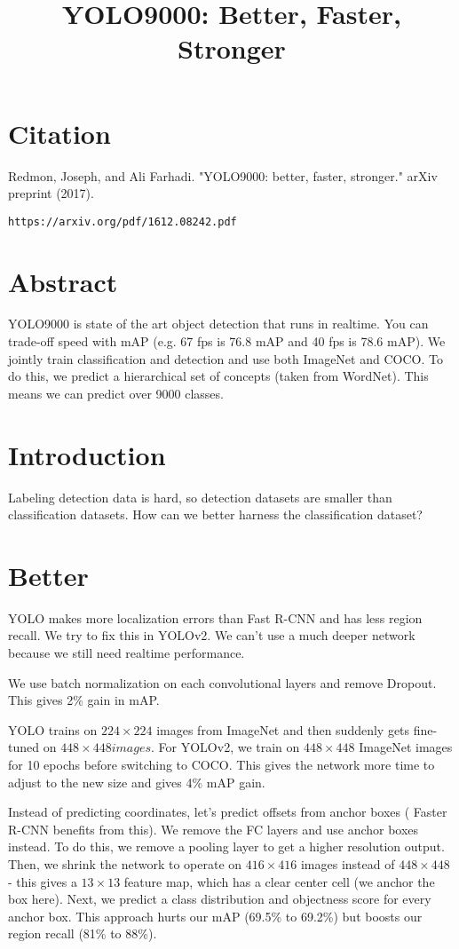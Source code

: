 \documentclass[a4paper]{article}
\title{YOLO9000: Better, Faster, Stronger}
\date{}
\begin{document}
\maketitle

\section{Citation}
Redmon, Joseph, and Ali Farhadi. "YOLO9000: better, faster, stronger." arXiv preprint (2017).

\begin{verbatim}
https://arxiv.org/pdf/1612.08242.pdf
\end{verbatim}

\section{Abstract}
YOLO9000 is state of the art object detection that runs in realtime. You can
trade-off speed with mAP (e.g. 67 fps is 76.8 mAP and 40 fps is 78.6 mAP). We
jointly train classification and detection and use both ImageNet and COCO. To
do this, we predict a hierarchical set of concepts (taken from WordNet). This
means we can predict over 9000 classes.

\section{Introduction}
Labeling detection data is hard, so detection datasets are smaller than
classification datasets. How can we better harness the classification dataset?

\section{Better}
YOLO makes more localization errors than Fast R-CNN and has less region
recall. We try to fix this in YOLOv2. We can't use a much deeper network
because we still need realtime performance.

We use batch normalization on each convolutional layers and remove Dropout.
This gives 2\% gain in mAP.

YOLO trains on $224 \times 224$ images from ImageNet and then suddenly gets
fine-tuned on $448 \times 448 images$. For YOLOv2, we train on $448 \times 448$
ImageNet images for 10 epochs before switching to COCO. This gives the network
more time to adjust to the new size and gives 4\% mAP gain.

Instead of predicting coordinates, let's predict offsets from anchor boxes (
Faster R-CNN benefits from this). We remove the FC layers and use anchor boxes
instead. To do this, we remove a pooling layer to get a higher resolution
output. Then, we shrink the network to operate on $416 \times 416$ images
instead of $448 \times 448$ - this gives a $13 \times 13$ feature map, which
has a clear center cell (we anchor the box here). Next, we predict a class
distribution and objectness score for every anchor box. This approach hurts our
mAP (69.5\% to 69.2\%) but boosts our region recall (81\% to 88\%).
\end{document}
